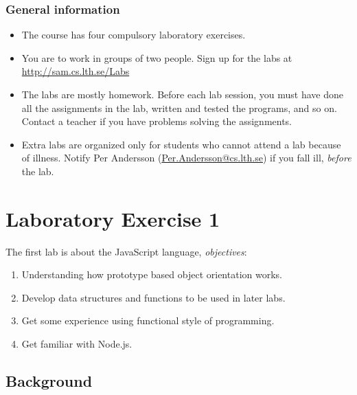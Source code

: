 \documentclass[fleqn, article, a4paper]{memoir}
\begin{document}
\maketitle
\thispagestyle{titlepage}
\vspace{-4cm}

\subsubsection*{General information}

\begin{itemize}\firmlist
\item The course has four compulsory laboratory exercises. 
\item You are to work in groups of two people. Sign up for the labs at\\ \url{http://sam.cs.lth.se/Labs}
\item The labs are mostly homework. Before each lab session, you must have done all the assign\-ments in the lab, written and tested the programs, and so on. Contact a teacher if you have problems solving the assignments. 
\item Extra labs are organized only for students who cannot attend a lab because of illness. Notify Per Andersson (\url{Per.Andersson@cs.lth.se}) if you fall ill, \emph{before} the lab.
\end{itemize}

\section*{Laboratory Exercise 1}
\n The first lab is about the JavaScript language, \emph{objectives}:

\begin{enumerate}\firmlist
\item Understanding how prototype based object orientation works.
\item Develop data structures and functions to be used in later labs.
\item Get some experience using functional style of programming.
\item Get familiar with Node.js.
\end{enumerate}

\subsection*{Background}
\end{document}
